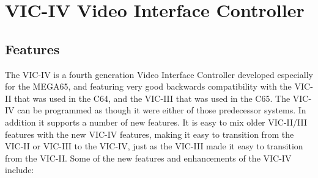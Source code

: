 \chapter{VIC-IV Video Interface Controller}
\label{cha:viciv}

\section{Features}
The VIC-IV is a fourth generation Video Interface Controller developed
especially for the MEGA65, and featuring very good backwards compatibility
with the VIC-II that was used in the C64, and the VIC-III that
was used in the C65.  The VIC-IV can be programmed as though it were either
of those predecessor systems.  In addition it supports a number of new
features. It is easy to mix older VIC-II/III features with the new VIC-IV
features, making it easy to transition from the VIC-II or VIC-III to the VIC-IV,
just as the VIC-III made it easy to transition from the VIC-II.  Some of the new
features and enhancements of the VIC-IV include:

